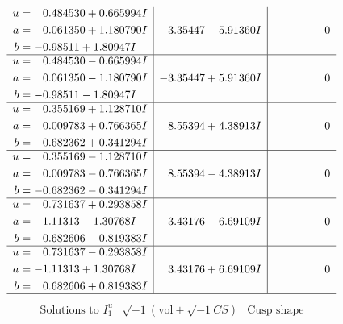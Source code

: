 \documentclass[1p]{elsarticle_modified}
\theoremstyle{definition}
\newcommand{\I}{\sqrt{-1}}
\begin{document}
$$\begin{array}{c|c|c}
\begin{aligned}
u &= \phantom{-}0.484530 + 0.665994 I \\
a &= \phantom{-}0.061350 + 1.180790 I \\
b &= -0.98511 + 1.80947 I\end{aligned}
 & -3.35447 - 5.91360 I & \phantom{-0.000000 } 0 \\ \hline\begin{aligned}
u &= \phantom{-}0.484530 - 0.665994 I \\
a &= \phantom{-}0.061350 - 1.180790 I \\
b &= -0.98511 - 1.80947 I\end{aligned}
 & -3.35447 + 5.91360 I & \phantom{-0.000000 } 0 \\ \hline\begin{aligned}
u &= \phantom{-}0.355169 + 1.128710 I \\
a &= \phantom{-}0.009783 + 0.766365 I \\
b &= -0.682362 + 0.341294 I\end{aligned}
 & \phantom{-}8.55394 + 4.38913 I & \phantom{-0.000000 } 0 \\ \hline\begin{aligned}
u &= \phantom{-}0.355169 - 1.128710 I \\
a &= \phantom{-}0.009783 - 0.766365 I \\
b &= -0.682362 - 0.341294 I\end{aligned}
 & \phantom{-}8.55394 - 4.38913 I & \phantom{-0.000000 } 0 \\ \hline\begin{aligned}
u &= \phantom{-}0.731637 + 0.293858 I \\
a &= -1.11313 - 1.30768 I \\
b &= \phantom{-}0.682606 - 0.819383 I\end{aligned}
 & \phantom{-}3.43176 - 6.69109 I & \phantom{-0.000000 } 0 \\ \hline\begin{aligned}
u &= \phantom{-}0.731637 - 0.293858 I \\
a &= -1.11313 + 1.30768 I \\
b &= \phantom{-}0.682606 + 0.819383 I\end{aligned}
 & \phantom{-}3.43176 + 6.69109 I & \phantom{-0.000000 } 0\\
 \hline 
 \end{array}$$\newpage$$\begin{array}{c|c|c}  
\text{Solutions to }I^u_{1}& \I (\text{vol} + \sqrt{-1}CS) & \text{Cusp shape}\\

\end{array}$$
\end{document}
